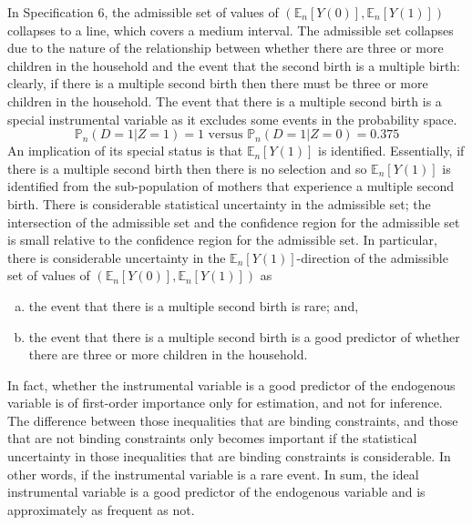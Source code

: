 \documentclass[12pt,a4paper,twoside]{article}
\numberwithin{equation}{section}
\begin{document}
In Specification 6, the admissible set of values of $(\mathbb{E}_n[Y(0)],\mathbb{E}_n[Y(1)])$ collapses to a line, which covers a medium interval. The admissible set collapses due to the nature of the relationship between whether there are three or more children in the household and the event that the second birth is a multiple birth: clearly, if there is a multiple second birth then there must be three or more children in the household. The event that there is a multiple second birth is a special instrumental variable as it excludes some events in the probability space.
\[\mathbb{P}_n(D=1|Z=1)=1\text{ versus }\mathbb{P}_n(D=1|Z=0)=0.375\]
An implication of its special status is that $\mathbb{E}_n[Y(1)]$ is identified. Essentially, if there is a multiple second birth then there is no selection and so $\mathbb{E}_n[Y(1)]$ is identified from the sub-population of mothers that experience a multiple second birth. There is considerable statistical uncertainty in the admissible set; the intersection of the admissible set and the confidence region for the admissible set is small relative to the confidence region for the admissible set. In particular, there is considerable uncertainty in the $\mathbb{E}_n[Y(1)]$-direction of the admissible set of values of $(\mathbb{E}_n[Y(0)],\mathbb{E}_n[Y(1)])$ as
\begin{enumerate}[(a)]
\item the event that there is a multiple second birth is rare; and,
\item the event that there is a multiple second birth is a good predictor of whether there are three or more children in the household.
\end{enumerate}  

In fact, whether the instrumental variable is a good predictor of the endogenous variable is of first-order importance only for estimation, and not for inference. The difference between those inequalities that are binding constraints, and those that are not binding constraints only becomes important if the statistical uncertainty in those inequalities that are binding constraints is considerable. In other words, if the instrumental variable is a rare event. In sum, the ideal instrumental variable is a good predictor of the endogenous variable and is approximately as frequent as not.  
\end{document}
